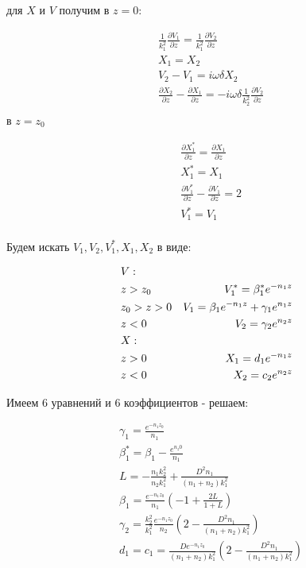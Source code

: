 	для $X$ и $V$ получим в $z = 0$:
	
	\begin{equation}
		\begin{aligned}
			& \frac{1}{k_1^2} \frac{\partial V_1}{\partial z} = \frac{1}{k_1^2} \frac{\partial V_2}{\partial z} \\
			&X_1 = X_2 \\
			& V_2 - V_1 = i \omega \delta X_2 \\
			&\frac{\partial X_2}{\partial z} - \frac{\partial X_1}{\partial z} = -i \omega \delta \frac{1}{k_2^2} \frac{\partial V_2}{\partial z} \\ 
		\end{aligned}
	\end{equation}
	\newpage
	в $z = z_0$
	
	
	\begin{equation}
		\begin{aligned}
			&\frac{\partial X_1^*}{\partial z} = \frac{\partial X_1}{\partial z} \\
			&X_1^* = X_1 \\
			&\frac{\partial V_1^*}{\partial z} - \frac{\partial V_1}{\partial z} = 2 \\
			&V_1^* = V_1 \\
		\end{aligned}
	\end{equation}
	
	Будем искать $V_1, V_2, V_1^*, X_1, X_2$ в виде:
	
	\begin{equation}
		\begin{aligned}
			&V: \\
			& z > z_0 \space 	&V_1^* = \beta_1^* e^{-n_1z} \\
			& z_0 > z > 0 \space	 &V_1 = \beta_1 e^{-n_1z} + \gamma_1 e^{n_1z} \\
			& z < 0 \space	&V_2 =  \gamma_2 e^{n_2z} \\
			&X: \\
			& z > 0 \space	&X_1 = d_1 e^{-n_1z} \\
			& z < 0	\space	&X_2 = c_2 e^{n_2z} 
		\end{aligned}
	\end{equation}
	
	Имеем 6 уравнений и 6 коэффициентов - решаем:
	
	\begin{equation}
		\begin{aligned}
			&\gamma_1 = \frac{e^{-n_1z_0}}{n_1} \\
			&\beta_1^* = \beta_1 - \frac{e^{n_z0}}{n_1} \\
			&L = -\frac{n_1 k_2^2}{n_2 k_1^2} + \frac{D^2 n_1}{(n_1 + n_2)k_1^2} \\
			&\beta_1 = \frac{e^{-n_1 z_0}}{n_1} (-1 + \frac{2L}{1 + L}) \\
			&\gamma_2 = \frac{k_2^2}{k_1^2} \frac{e^{-n_1z_0}}{n_2}(2 - \frac{D^2 n_1}{(n_1 + n_2)k_1^2}) \\
			&d_1 = c_1 = \frac{D e^{-n_1 z_0}}{(n_1 + n_2) k_1^2}(2 - \frac{D^2 n_1}{(n_1 + n_2)k_1^2}) \\ 
		\end{aligned}
	\end{equation}
	
